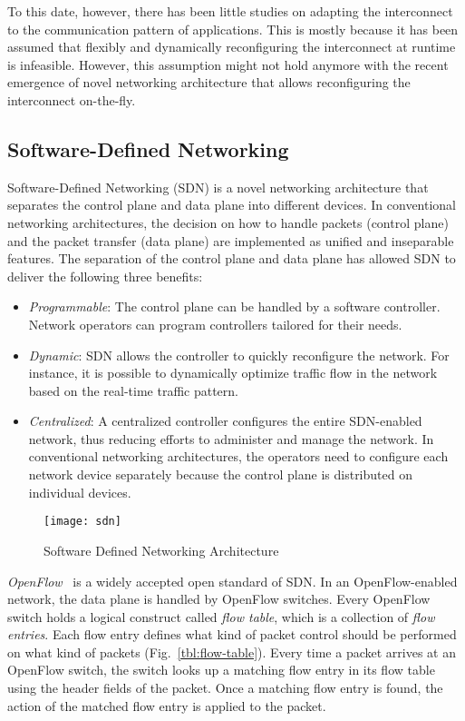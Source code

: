 To this date, however, there has been little studies on adapting the
interconnect to the communication pattern of applications. This is mostly
because it has been assumed that flexibly and dynamically reconfiguring the
interconnect at runtime is infeasible. However, this assumption might not hold
anymore with the recent emergence of novel networking architecture that allows
reconfiguring the interconnect on-the-fly.

\subsection{Software-Defined Networking}

Software-Defined Networking (SDN) is a novel networking architecture
that separates the control plane and data plane into different devices.
In conventional networking architectures, the decision on how to handle
packets (control plane) and the packet transfer (data plane) are
implemented as unified and inseparable features. The separation of the
control plane and data plane has allowed SDN to deliver the following
three benefits:

\begin{itemize}
\item
  \emph{Programmable}: The control plane can be handled by a software
  controller. Network operators can program controllers tailored for
  their needs.
\item
  \emph{Dynamic}: SDN allows the controller to quickly reconfigure the
  network. For instance, it is possible to dynamically optimize traffic
  flow in the network based on the real-time traffic pattern.
\item
  \emph{Centralized}: A centralized controller configures the entire
  SDN-enabled network, thus reducing efforts to administer and manage
  the network. In conventional networking architectures, the operators
  need to configure each network device separately because the control
  plane is distributed on individual devices.
\end{itemize}

\begin{figure}
    \centering
    \texttt{[image: sdn]}
    \caption{Software Defined Networking Architecture}%
    \label{fig:sdn-architecture}
\end{figure}

\emph{OpenFlow}~\autocite{McKeown2008} is a widely accepted open
standard of SDN\@. In an OpenFlow-enabled network, the data plane is
handled by OpenFlow switches. Every OpenFlow switch holds a logical
construct called \emph{flow table}, which is a collection of \emph{flow
entries}. Each flow entry defines what kind of packet control should be
performed on what kind of packets (Fig.~\ref{tbl:flow-table}). Every
time a packet arrives at an OpenFlow switch, the switch looks up a
matching flow entry in its flow table using the header fields of the
packet. Once a matching flow entry is found, the action of the matched
flow entry is applied to the packet.

